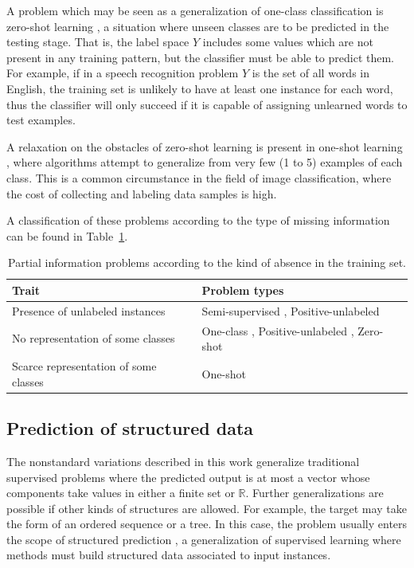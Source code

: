 A problem which may be seen as a generalization of one-class classification is zero-shot learning \cite{zeroshot}, a situation where unseen classes are to be predicted in the testing stage. That is, the label space $Y$ includes some values which are not present in any training pattern, but the classifier must be able to predict them. For example, if in a speech recognition problem $Y$ is the set of all words in English, the training set is unlikely to have at least one instance for each word, thus the classifier will only succeed if it is capable of assigning unlearned words to test examples.

A relaxation on the obstacles of zero-shot learning is present in one-shot learning \cite{oneshot}, where algorithms attempt to generalize from very few (1 to 5) examples of each class. This is a common circumstance in the field of image classification, where the cost of collecting and labeling data samples is high.

A classification of these problems according to the type of missing information can be found in Table~\ref{p3tbl.partial-problems}.

\begin{table}[ht]
\centering
\renewcommand{\arraystretch}{1.4}
\begin{tabular}{l  l}
\toprule
\textbf{Trait} & \textbf{Problem types} \\ \hline
Presence of unlabeled instances & Semi-supervised \cite{semi-sup}, Positive-unlabeled \cite{pu-learn} \\
No representation of some classes &   One-class \cite{oneclass}, Positive-unlabeled \cite{pu-learn}, Zero-shot \cite{zeroshot} \\
Scarce representation of some classes &  One-shot \cite{oneshot}\\
\toprule
\end{tabular}
\caption{\label{p3tbl.partial-problems}Partial information problems according to the kind of absence in the training set.}
\end{table}

\subsection{Prediction of structured data}

The nonstandard variations described in this work generalize traditional supervised problems where the predicted output is at most a vector whose components take values in either a finite set or $\mathbb R$. Further generalizations are possible if other kinds of structures are allowed. For example, the target may take the form of an ordered sequence or a tree. In this case, the problem usually enters the scope of structured prediction \cite{str-pred}, a generalization of supervised learning where methods must build structured data associated to input instances.

